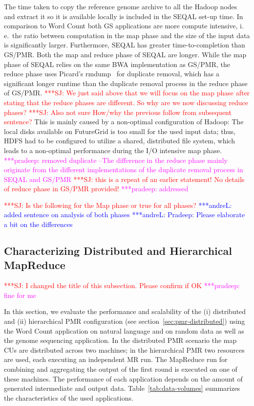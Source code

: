 \documentclass{acm_proc_article-sp}
\newcommand{\jhanote}[1]{ {\textcolor{red} { ***SJ: #1 }}}
\newcommand{\alnote}[1]{ {\textcolor{blue} { ***andreL: #1 }}}
\newcommand{\pnote}[1]{ {\textcolor{magenta} { ***pradeep: #1 }}}
\newcommand{\alnote}[1]{}
\newcommand{\pnote}[1]{}
\newcommand{\jhanote}[1]{}
\newcommand{\upp}{\vspace*{-0.5em}}
\begin{document}
The time taken to copy the reference genome archive to all the Hadoop
nodes and extract it so it is available locally is included in the
SEQAL set-up time. In comparison to Word Count both GS applications
are more compute intensive, i.\,e.\ the ratio between computation in
the map phase and the size of the input data is significantly
larger. Furthermore, SEQAL has greater time-to-completion than
GS/PMR. Both the map and reduce phase of SEQAL are longer. While the
map phase of SEQAL relies on the same BWA implementation as GS/PMR,
the reduce phase uses Picard's rmdump~\cite{picard} for duplicate
removal, which has a significant longer runtime than the duplicate
removal process in the reduce phase of GS/PMR.  \jhanote{We just said
  above that we will focus on the map phase after stating that the
  reduce phases are different. So why are we now discussing reduce
  phases?}  \jhanote{Also not sure How/why the previous follow from
  subsequent sentence?}  This is mainly caused by a non-optimal
configuration of Hadoop: The local disks available on FutureGrid is
too small for the used input data; thus, HDFS had to be configured to
utilize a shared, distributed file system, which leads to a
non-optimal performance during the I/O intensive map phase. \pnote{ removed duplicate --The
difference in the reduce phase mainly originate from the different
implementations of the duplicate removal process in SEQAL and
GS/PMR} \jhanote{this is a repeat of an earlier statement! No details
  of reduce phase in GS/PMR provided!} \pnote{addressed}

\jhanote{Is the
  following for the Map phase or true for all phases?} \alnote{added
  sentence on analysis of both phases} 
\alnote{Pradeep: Please elaborate a bit on the differences}
\upp\upp

\subsection{Characterizing Distributed and Hierarchical MapReduce}

\jhanote{I changed the title of this subsection. Please confirm if OK}
\pnote{fine for me}

In this section, we evaluate the performance and scalability of the
(i) distributed and (ii) hierarchical PMR configuration (see
section~\ref{sec:pmr-distributed}) using the Word Count application on
natural language and on random data as well as the genome sequencing
application. In the distributed PMR scenario the map CUs are
distributed across two machines; in the hierarchical PMR two
resources are used, each executing an independent MR run. The MapReduce
run for combining and aggregating the output of the first round is
executed on one of these machines. The performance of each application
depends on the amount of generated intermediate and output data.
Table~\ref{tab:data-volumes} summarizes the characteristics of the
used applications.
\end{document}
